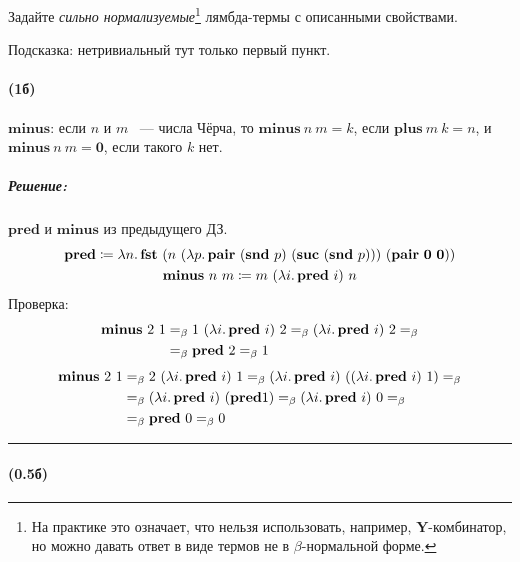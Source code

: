 \documentclass{article}
\newenvironment{proof}{\subparagraph{\hspace{-1em}Решение:\newline}\-}{\par\noindent\rule{\textwidth}{0.4pt}}
\newcommand{\comb}[1]{\mathbf{#1}}
\newcommand{\term}[1]{\mathbf{#1}}
\newcommand{\eqbeta}{=_\beta}
\renewcommand{\emph}[1]{{\color{blue} \textit{#1}}}
\begin{document}
    \subsubsection{}

    Задайте \emph{сильно нормализуемые}\footnote{На практике это означает, что нельзя использовать, например, $\comb{Y}$-комбинатор, но можно давать ответ в виде термов не в $\beta$-нормальной форме.} лямбда-термы с описанными свойствами.

    Подсказка: нетривиальный тут только первый пункт.

    \paragraph{(1б)}

    $\term{minus}$: если $n$ и $m$ ~--- числа Чёрча, то $\term{minus}~n~m = k$,
    если $\term{plus}~m~k = n$, и $\term{minus}~n~m = \term{0}$, если такого $k$
    нет.

    \begin{proof}
        \(\term{pred}\) и \(\term{minus}\) из предыдущего ДЗ.
        \begin{gather}
            \term{pred} \coloneqq \lambda n\ldotp \term{fst}~(n~(\lambda p\ldotp \term{pair}~(\term{snd}~p)~(\term{suc}~(\term{snd}~p)))~(\term{pair}~\term{0}~\term{0})) \\
            \term{minus}~n~m \coloneqq m~(\lambda i\ldotp \term{pred}~i)~n
        \end{gather}
        Проверка:
        \begin{align}
            \term{minus}~2~1 & \eqbeta 1~(\lambda i\ldotp \term{pred}~i)~2 \eqbeta (\lambda i\ldotp \term{pred}~i)~2 \eqbeta \\
                             & \eqbeta \term{pred}~2 \eqbeta 1
        \end{align}
        \begin{align}
            \term{minus}~2~1 & \eqbeta 2~(\lambda i\ldotp \term{pred}~i)~1 \eqbeta (\lambda i\ldotp \term{pred}~i)~((\lambda i\ldotp \term{pred}~i)~1) \eqbeta \\
                             & \eqbeta (\lambda i\ldotp \term{pred}~i)~(\term{pred} 1) \eqbeta (\lambda i\ldotp \term{pred}~i)~0 \eqbeta \\
                             & \eqbeta \term{pred}~0 \eqbeta 0
        \end{align}
    \end{proof}

    \paragraph{(0.5б)}
\end{document}
